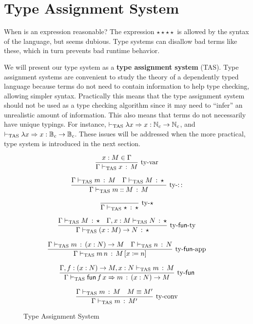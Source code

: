 \section{\SLang{} Type Assignment System}
 
When is an expression reasonable? The expression $\star\star\star\star$ is allowed by the syntax of the language, but seems dubious.
Type systems can disallow bad terms like these, which in turn prevents bad runtime behavior.
 
We will present our type system as a \textbf{type assignment system} (\ac{TAS}).
Type assignment systems are convenient to study the theory of a dependently typed language because terms do not need to contain information to help type checking, allowing simpler syntax. %
Practically this means that the type assignment system should not be used as a type checking algorithm since it may need to ``infer'' an unrealistic amount of information.
This also means that terms do not necessarily have unique typings.
For instance, $\vdash_{\mathrm{TAS}}\lambda x\Rightarrow x:\mathbb{N}_{c}\rightarrow\mathbb{N}_{c}$, and $\vdash_{\mathrm{TAS}}\lambda x\Rightarrow x:\mathbb{B}_{c}\rightarrow\mathbb{B}_{c}$.
These issues will be addressed when the more practical, \bidir{} type system is introduced in the next section.
 
\begin{figure}
\[
\frac{x:M\in\Gamma}{\Gamma\vdash_{\mathrm{TAS}} x\,:\,M}\,\operatorname{ty-var}
\]
 
\[
\frac{\Gamma\vdash_{\mathrm{TAS}} m\,:\,M \quad \Gamma\vdash_{\mathrm{TAS}} M\,:\,\star\
}{\Gamma\vdash_{\mathrm{TAS}} m::M\,:\,M}
\,\operatorname{ty-::}
\]
 
\[
\frac{{\color{gray}\ }}{\Gamma\tasys\star\,:\,\star}\,\rulename{ty-\star}
\]
 
\[
\frac{\Gamma\vdash_{\mathrm{TAS}} M\,:\,\star\quad\Gamma,x:M\vdash_{\mathrm{TAS}} N\,:\,\star}{\Gamma\vdash_{\mathrm{TAS}}\left(x:M\right)\rightarrow N\,:\,\star}\,\operatorname{ty-\mathsf{fun}-ty}
\]
 
\[
\frac{\Gamma\vdash_{\mathrm{TAS}} m\,:\,\left(x:N\right)\rightarrow M\quad\Gamma\vdash_{\mathrm{TAS}} n\,:\,N}{\Gamma\vdash_{\mathrm{TAS}} m\,n\,:\,M\left[x\coloneqq n\right]}\,\operatorname{ty-\mathsf{fun}-app}
\]
 
\[
\frac{\Gamma,f:\left(x:N\right)\rightarrow M,x:N\vdash_{\mathrm{TAS}} m\,:\,M}{\Gamma\vdash_{\mathrm{TAS}}\mathsf{fun}\,f\,x\Rightarrow m\,:\,\left(x:N\right)\rightarrow M}\,\operatorname{ty-\mathsf{fun}}
\]
 
\[
\frac{\Gamma\vdash_{\mathrm{TAS}} m\,:\,M\quad M\equiv M'}{\Gamma\vdash_{\mathrm{TAS}} m\,:\,M'}\,\operatorname{ty-conv}
\]
 
\caption{\SLang{} Type Assignment System}
\label{fig:surface-TAS}
\end{figure}
 
